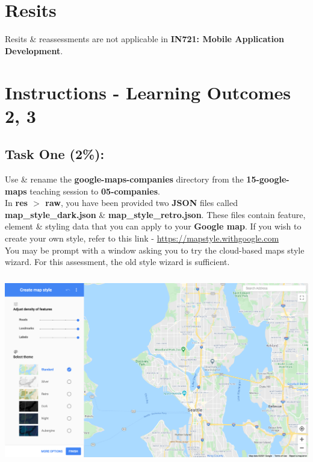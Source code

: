 \documentclass{article}
\begin{document}
\section*{Resits}
Resits \& reassessments are not applicable in \textbf{IN721: Mobile Application Development}.

\section*{Instructions - Learning Outcomes 2, 3}
\subsection*{Task One (2\%):}
Use \& rename the \textbf{google-maps-companies} directory from the \textbf{15-google-maps} teaching session to \textbf{05-companies}. \\

In \textbf{res $>$ raw}, you have been provided two \textbf{JSON} files called \textbf{map\_style\_dark.json} \& \textbf{map\_style\_retro.json}. These files contain feature, element \& styling data that you can apply to your \textbf{Google map}. If you wish to create your own style, refer to this link - \href{https://mapstyle.withgoogle.com}{https://mapstyle.withgoogle.com} \\

You may be prompt with a window asking you to try the cloud-based maps style wizard. For this assessment, the old style wizard is sufficient. \\

\includegraphics[width=15cm, height=9cm]{../tex/img/practicals/05-companies-1.png} \\
\end{document}
